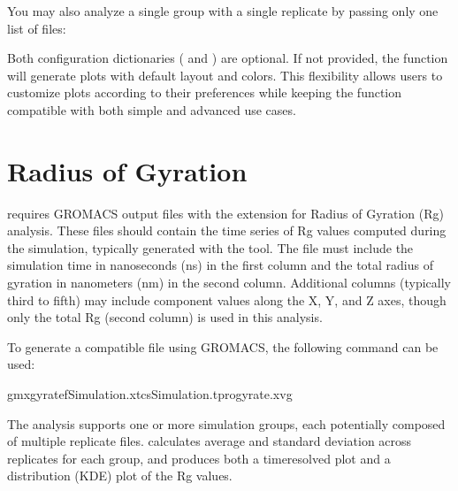 \documentclass[a4paper,10pt,english]{sphinxmanual}
\begin{document}
\sphinxAtStartPar
You may also analyze a single group with a single replicate by passing only one list of files:

\begin{sphinxVerbatim}[commandchars=\\\{\}]
 
\end{sphinxVerbatim}

\sphinxAtStartPar
Both configuration dictionaries ( and ) are optional. If not provided, the function will generate plots with default layout and colors. This flexibility allows users to customize plots according to their preferences while keeping the function compatible with both simple and advanced use cases.


\section{Radius of Gyration}
\label{\detokenize{Input:radius-of-gyration}}
\sphinxAtStartPar
{} requires GROMACS output files with the  extension for Radius of Gyration (Rg) analysis. These files should contain the time series of Rg values computed during the simulation, typically generated with the  tool. The  file must include the simulation time in nanoseconds (ns) in the first column and the total radius of gyration in nanometers (nm) in the second column. Additional columns (typically third to fifth) may include component values along the X, Y, and Z axes, though only the total Rg (second column) is used in this analysis.

\sphinxAtStartPar
To generate a compatible file using GROMACS, the following command can be used:

\begin{sphinxVerbatim}[commandchars=\\\{\}]
gmxgyrate\PYGZhy{}fSimulation.xtc\PYGZhy{}sSimulation.tpr\PYGZhy{}ogyrate.xvg
\end{sphinxVerbatim}

\sphinxAtStartPar
The analysis supports one or more simulation groups, each potentially composed of multiple replicate  files.  calculates average and standard deviation across replicates for each group, and produces both a time\sphinxhyphen{}resolved plot and a distribution (KDE) plot of the Rg values.
\end{document}
